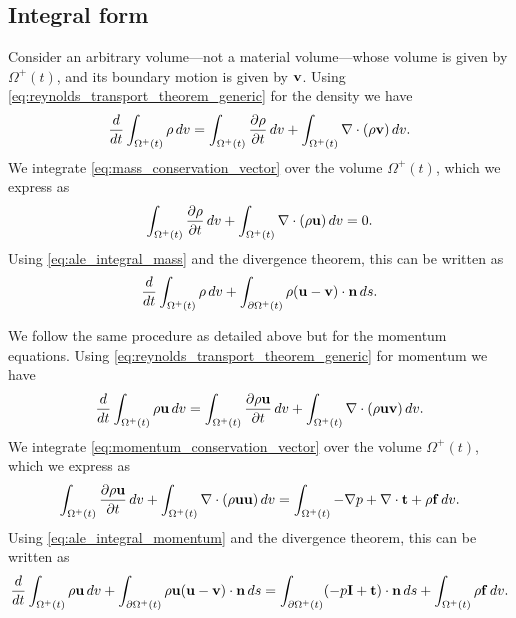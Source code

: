 \documentclass[oneside,a4paper,11pt]{report}
\begin{document}
\subsection{Integral form} 
Consider an arbitrary volume---not a material volume---whose volume is given by $\Omega^+(t)$, and its boundary motion is given by $\mathbf{v}$. Using \cref{eq:reynolds_transport_theorem_generic} for the density we have
\begin{equation}
\label{eq:ale_integral_mass}
    \frac{d}{dt} \int_{\Omega^+(t)} \rho \, dv = \int_{\Omega^+(t)} \frac{\partial \rho}{\partial t} \, dv + \int_{\Omega^+(t)} \nabla \cdot (\rho \mathbf{v}) \, dv.
\end{equation}
We integrate \cref{eq:mass_conservation_vector} over the volume $\Omega^+(t)$, which we express as
\begin{equation*}
    \int_{\Omega^+(t)} \frac{\partial \rho}{\partial t} \, dv + \int_{\Omega^+(t)} \nabla \cdot (\rho \mathbf{u}) \, dv = 0.
\end{equation*}
Using \cref{eq:ale_integral_mass} and the divergence theorem, this can be written as
\begin{equation}
    \label{eq:ale_integral_mass_conservation}
    \frac{d}{dt} \int_{\Omega^+(t)} \rho \, dv + \int_{\partial \Omega^+(t)} \rho (\mathbf{u} - \mathbf{v}) \cdot \mathbf{n} \, ds.
\end{equation}

We follow the same procedure as detailed above but for the momentum equations. Using \cref{eq:reynolds_transport_theorem_generic} for momentum we have
\begin{equation}
\label{eq:ale_integral_momentum}
    \frac{d}{dt} \int_{\Omega^+(t)} \rho \mathbf{u} \, dv = \int_{\Omega^+(t)} \frac{\partial \rho \mathbf{u}}{\partial t} \, dv + \int_{\Omega^+(t)} \nabla \cdot (\rho \mathbf{u} \mathbf{v}) \, dv.
\end{equation}
We integrate \cref{eq:momentum_conservation_vector} over the volume $\Omega^+(t)$, which we express as
\begin{equation*}
    \int_{\Omega^+(t)} \frac{\partial \rho \mathbf{u}}{\partial t} \, dv + \int_{\Omega^+(t)} \nabla \cdot (\rho \mathbf{u} \mathbf{u}) \, dv = \int_{\Omega^+(t)} -\nabla p + \nabla \cdot \mathbf{t} + \rho \mathbf{f} \, dv.
\end{equation*}
Using \cref{eq:ale_integral_momentum} and the divergence theorem, this can be written as
\begin{equation}
    \label{eq:ale_integral_momentum_conservation}
    \frac{d}{dt} \int_{\Omega^+(t)}  \rho \mathbf{u} \, dv + \int_{\partial \Omega^+(t)} \rho \mathbf{u} (\mathbf{u} - \mathbf{v}) \cdot \mathbf{n} \, ds = \int_{\partial \Omega^+(t)} (- p \mathbf{I} + \mathbf{t}) \cdot \mathbf{n} \, ds + \int_{\Omega^+(t)} \rho \mathbf{f} \, dv.
\end{equation}
\end{document}

